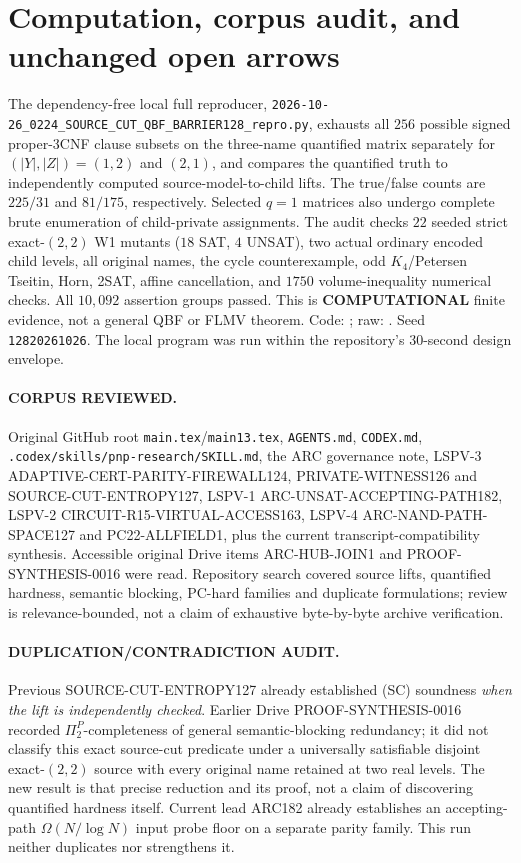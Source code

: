 \documentclass[11pt]{article}
\begin{document}
\section{Computation, corpus audit, and unchanged open arrows}
The dependency-free local full reproducer, \texttt{2026-10-26\_0224\_SOURCE\_CUT\_QBF\_BARRIER128\_repro.py}, exhausts all $256$ possible signed proper-3CNF clause subsets on the three-name quantified matrix separately for $(|Y|,|Z|)=(1,2)$ and $(2,1)$, and compares the quantified truth to independently computed source-model-to-child lifts. The true/false counts are $225/31$ and $81/175$, respectively. Selected $q=1$ matrices also undergo complete brute enumeration of child-private assignments. The audit checks $22$ seeded strict exact-$(2,2)$ W1 mutants ($18$ SAT, $4$ UNSAT), two actual ordinary encoded child levels, all original names, the cycle counterexample, odd $K_4$/Petersen Tseitin, Horn, 2SAT, affine cancellation, and $1750$ volume-inequality numerical checks. All $10,092$ assertion groups passed. This is \textbf{COMPUTATIONAL} finite evidence, not a general QBF or FLMV theorem. Code: ; raw: . Seed \texttt{12820261026}. The local program was run within the repository's 30-second design envelope.

\paragraph{CORPUS REVIEWED.} Original GitHub root \texttt{main.tex}/\texttt{main13.tex}, \texttt{AGENTS.md}, \texttt{CODEX.md}, \texttt{.codex/skills/pnp-research/SKILL.md}, the ARC governance note, LSPV-3 ADAPTIVE-CERT-PARITY-FIREWALL124, PRIVATE-WITNESS126 and SOURCE-CUT-ENTROPY127, LSPV-1 ARC-UNSAT-ACCEPTING-PATH182, LSPV-2 CIRCUIT-R15-VIRTUAL-ACCESS163, LSPV-4 ARC-NAND-PATH-SPACE127 and PC22-ALLFIELD1, plus the current transcript-compatibility synthesis. Accessible original Drive items ARC-HUB-JOIN1 and PROOF-SYNTHESIS-0016 were read. Repository search covered source lifts, quantified hardness, semantic blocking, PC-hard families and duplicate formulations; review is relevance-bounded, not a claim of exhaustive byte-by-byte archive verification.

\paragraph{DUPLICATION/CONTRADICTION AUDIT.} Previous SOURCE-CUT-ENTROPY127 already established (SC) soundness \emph{when the lift is independently checked}. Earlier Drive PROOF-SYNTHESIS-0016 recorded $\Pi_2^P$-completeness of general semantic-blocking redundancy; it did not classify this exact source-cut predicate under a universally satisfiable disjoint exact-$(2,2)$ source with every original name retained at two real levels. The new result is that precise reduction and its proof, not a claim of discovering quantified hardness itself. Current lead ARC182 already establishes an accepting-path $\Omega(N/\log N)$ input probe floor on a separate parity family. This run neither duplicates nor strengthens it.
\end{document}
